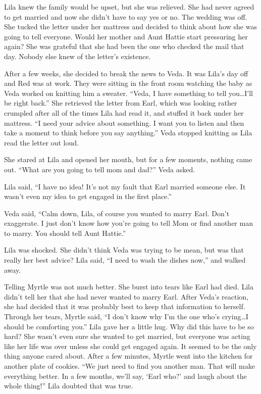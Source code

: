 \documentclass[
  letterpaper,
]{book}
\begin{document}
Lila knew the family would be upset, but she was relieved. She had never
agreed to get married and now she didn't have to say yes or no. The
wedding was off. She tucked the letter under her mattress and decided to
think about how she was going to tell everyone. Would her mother and
Aunt Hattie start pressuring her again? She was grateful that she had
been the one who checked the mail that day. Nobody else knew of the
letter's existence.

After a few weeks, she decided to break the news to Veda. It was Lila's
day off and Red was at work. They were sitting in the front room
watching the baby as Veda worked on knitting him a sweater. ``Veda, I
have something to tell you\ldots I'll be right back.'' She retrieved the
letter from Earl, which was looking rather crumpled after all of the
times Lila had read it, and stuffed it back under her mattress. ``I need
your advice about something. I want you to listen and then take a moment
to think before you say anything.'' Veda stopped knitting as Lila read
the letter out loud.

She stared at Lila and opened her mouth, but for a few moments, nothing
came out. ``What are you going to tell mom and dad?'' Veda asked.

Lila said, ``I have no idea! It's not my fault that Earl married someone
else. It wasn't even my idea to get engaged in the first place.''

Veda said, ``Calm down, Lila, of course you wanted to marry Earl. Don't
exaggerate. I just don't know how you're going to tell Mom or find
another man to marry. You should tell Aunt Hattie.''

Lila was shocked. She didn't think Veda was trying to be mean, but was
that really her best advice? Lila said, ``I need to wash the dishes
now,'' and walked away.

Telling Myrtle was not much better. She burst into tears like Earl had
died. Lila didn't tell her that she had never wanted to marry Earl.
After Veda's reaction, she had decided that it was probably best to keep
that information to herself. Through her tears, Myrtle said, ``I don't
know why I'm the one who's crying\ldots I should be comforting you.''
Lila gave her a little hug. Why did this have to be so hard? She wasn't
even sure she wanted to get married, but everyone was acting like her
life was over unless she could get engaged again. It seemed to be the
only thing anyone cared about. After a few minutes, Myrtle went into the
kitchen for another plate of cookies. ``We just need to find you another
man. That will make everything better. In a few months, we'll say, `Earl
who?' and laugh about the whole thing!'' Lila doubted that was true.
\end{document}
